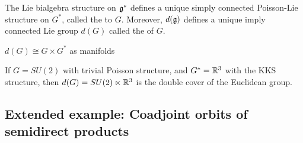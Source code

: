 \documentclass{article}
\begin{document}
The Lie bialgebra structure on $\mathfrak{g}^\ast$ defines a unique simply connected Poisson-Lie structure on $G^\ast$, called the  to $G$. Moreover, $d(\mathfrak{g})$ defines a unique imply connected Lie group $d(G)$ called the  of $G$. 

\begin{fact}
$d(G) \cong G \times G^\ast$ as manifolds 
\end{fact}

\begin{example}
If $G = SU(2)$ with trivial Poisson structure, and $G^\ast = \mathbb{R}^3$ with the KKS structure, then $d(G) = SU(2) \ltimes \mathbb{R}^3$ is the double cover of the Euclidean group. 
\end{example}

\subsection{Extended example: Coadjoint orbits of semidirect products}
\end{document}

